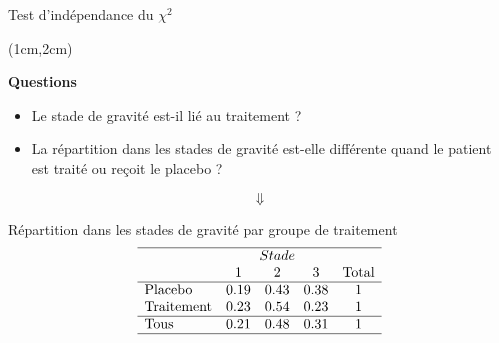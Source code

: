 \documentclass{beamer}
\begin{document}

\begin{frame}{Test d'indépendance du $\chi^2$}
\begin{textblock*}{\textwidth}(1cm,2cm)

\begin{center}{\bf Questions} \end{center}
\begin{itemize}
\item Le stade de gravité est-il lié au traitement ? 
\item La répartition dans les stades de gravité est-elle différente quand le patient est traité ou reçoit le placebo ? 
\end{itemize}
$$\Downarrow$$ 





\begin{center}
\small

Répartition dans les stades de gravité par groupe de traitement
$$
\begin{array}{lcccc}
\hline 
& \multicolumn{3}{c}{Stade} \\
& 1 & 2 & 3 & \mbox{Total} \\
\hline
\mbox{Placebo} & 0.19 & 0.43 & 0.38 & 1 \\
\mbox{Traitement} & 0.23 & 0.54 & 0.23 & 1 \\
\hline 
\mbox{Tous} & 0.21 & 0.48 & 0.31 & 1 \\
\hline
\end{array}
$$
\end{center}
\end{textblock*}

\end{frame}
\end{document}
